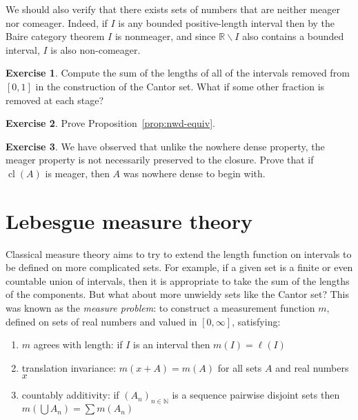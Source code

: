\documentclass[11pt,oneside]{amsart}
\DeclareMathOperator{\cl}{cl}
\newcommand{\NN}{\mathbb N}
\newcommand{\RR}{\mathbb R}
\theoremstyle{definition}
\newtheorem{exerc}{Exercise}[section]
\theoremstyle{definition}
\theoremstyle{remark}
\begin{document}
We should also verify that there exists sets of numbers that are neither meager nor comeager. Indeed, if $I$ is any bounded positive-length interval then by the Baire category theorem $I$ is nonmeager, and since $\RR\smallsetminus I$ also contains a bounded interval, $I$ is also non-comeager.

\begin{exerc}
  \label{exerc:cantor}
  Compute the sum of the lengths of all of the intervals removed from $[0,1]$ in the construction of the Cantor set. What if some other fraction is removed at each stage?
\end{exerc}

\begin{exerc}
  \label{exerc:nwd-equiv}
  Prove Proposition~\ref{prop:nwd-equiv}.
\end{exerc}

\begin{exerc}
  We have observed that unlike the nowhere dense property, the meager property is not necessarily preserved to the closure. Prove that if $\cl(A)$ is meager, then $A$ was nowhere dense to begin with.
\end{exerc}


\section{Lebesgue measure theory}

Classical measure theory aims to try to extend the length function on intervals to be defined on more complicated sets. For example, if a given set is a finite or even countable union of intervals, then it is appropriate to take the sum of the lengths of the components. But what about more unwieldy sets like the Cantor set? This was known as the \emph{measure problem}: to construct a measurement function $m$, defined on sets of real numbers and valued in $[0,\infty]$, satisfying:
\begin{enumerate}
\item $m$ agrees with length: if $I$ is an interval then $m(I)=\ell(I)$
\item translation invariance: $m(x+A)=m(A)$ for all sets $A$ and real numbers $x$
\item countably additivity: if $(A_n)_{n\in\NN}$ is a sequence pairwise disjoint sets then $m(\bigcup A_n)=\sum m(A_n)$
\end{enumerate}
\end{document}

